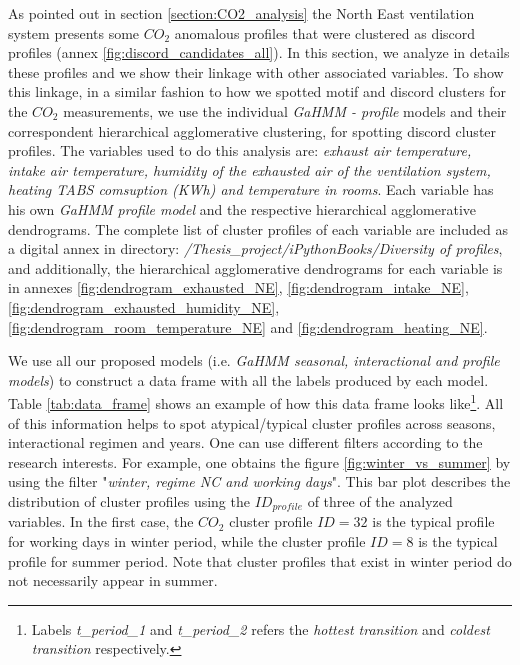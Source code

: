 As pointed out in section \ref{section:CO2_analysis} the North East ventilation system presents some $CO_2$ anomalous profiles that were clustered as discord profiles (annex \ref{fig:discord_candidates_all}). In this section, we analyze in details these profiles and we show their linkage with other associated variables. To show this linkage, in a similar fashion to how we spotted motif and discord clusters for the $CO_2$ measurements, we use the individual \textit{GaHMM - profile} models and their correspondent hierarchical agglomerative clustering, for spotting discord cluster profiles. The variables used to do this analysis are: \textit{exhaust air temperature, intake air temperature, humidity of the exhausted air of the ventilation system, heating TABS comsuption (KWh) and temperature in rooms}. Each variable has his
own \textit{GaHMM profile model} and the respective hierarchical agglomerative dendrograms. The complete list of cluster profiles of each variable are included as a digital annex in directory: \textit{/Thesis\_project/iPythonBooks/Diversity of profiles}, and additionally, the hierarchical agglomerative dendrograms for each variable is in annexes \ref{fig:dendrogram_exhausted_NE}, \ref{fig:dendrogram_intake_NE}, \ref{fig:dendrogram_exhausted_humidity_NE}, \ref{fig:dendrogram_room_temperature_NE} and \ref{fig:dendrogram_heating_NE}. 


We use all our proposed models (i.e. \textit{GaHMM seasonal, interactional and profile models}) to construct a data frame with all the labels produced by each model. Table \ref{tab:data_frame} shows an example of how this data frame looks like\footnote{Labels \textit{t\_period\_1} and \textit{t\_period\_2} refers the \textit{hottest transition} and \textit{coldest transition} respectively.}. All of this information helps to spot atypical/typical cluster profiles across seasons, interactional regimen and years. One can use different filters according to the research interests. For example, one obtains the figure \ref{fig:winter_vs_summer} by using the filter "\textit{winter, regime NC and working days}". This bar plot describes the distribution of cluster profiles using the $ID_{profile}$ of three of the analyzed variables. In the first case, the $CO_2$ cluster profile $ID=32$ is the typical profile for working days in winter period, while the cluster profile $ID=8$ is the typical profile for summer period. Note that cluster profiles that exist in winter period do not necessarily appear in summer.     

